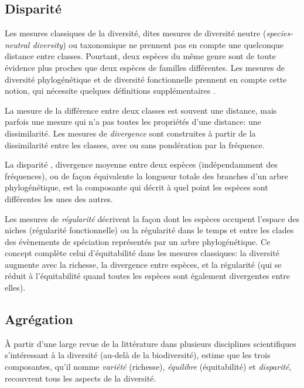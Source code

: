 \documentclass[
  11pt,
  french,
  a4paper,
  extrafontsizes,onecolumn,openright
  ]{memoir}
\begin{document}
\hypertarget{disparituxe9}{%
\subsection{Disparité}\label{disparituxe9}}

Les mesures classiques de la diversité, dites mesures de diversité neutre (\emph{species-neutral diversity}) ou taxonomique ne prennent pas en compte une quelconque distance entre classes.
Pourtant, deux espèces du même genre sont de toute évidence plus proches que deux espèces de familles différentes.
Les mesures de diversité phylogénétique et de diversité fonctionnelle prennent en compte cette notion, qui nécessite quelques définitions supplémentaires \autocite{Mouillot2005,Ricotta2007}.

La mesure de la différence entre deux classes est souvent une distance, mais parfois une mesure qui n'a pas toutes les propriétés d'une distance: une dissimilarité.
Les mesures de \emph{divergence} \autocite{Pavoine2011} sont construites à partir de la dissimilarité entre les classes, avec ou sans pondération par la fréquence.

La disparité \autocite{Runnegar1987}, divergence moyenne entre deux espèces (indépendamment des fréquences), ou de façon équivalente la longueur totale des branches d'un arbre phylogénétique, est la composante qui décrit à quel point les espèces sont différentes les unes des autres.

Les mesures de \emph{régularité} décrivent la façon dont les espèces occupent l'espace des niches (régularité fonctionnelle) ou la régularité dans le temps et entre les clades des évènements de spéciation représentés par un arbre phylogénétique.
Ce concept complète celui d'équitabilité dans les mesures classiques: la diversité augmente avec la richesse, la divergence entre espèces, et la régularité (qui se réduit à l'équitabilité quand toutes les espèces sont également divergentes entre elles).

\hypertarget{agruxe9gation}{%
\subsection{Agrégation}\label{agruxe9gation}}

À partir d'une large revue de la littérature dans plusieurs disciplines scientifiques s'intéressant à la diversité (au-delà de la biodiversité), \textcite{Stirling2007} estime que les trois composantes, qu'il nomme \emph{variété} (richesse), \emph{équilibre} (équitabilité) et \emph{disparité}, recouvrent tous les aspects de la diversité.
\end{document}
